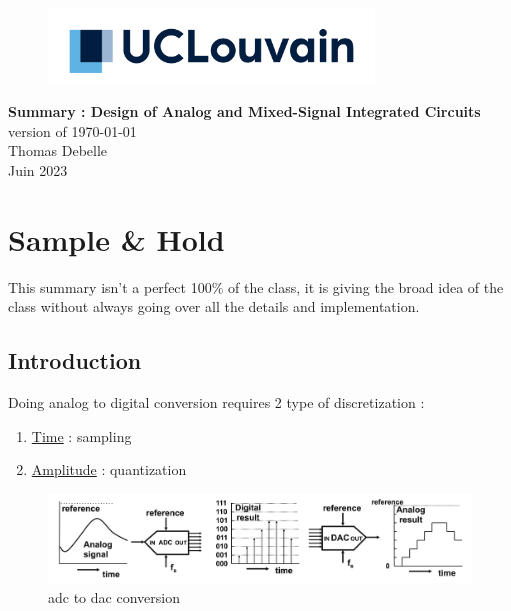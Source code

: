 \documentclass{report}
\begin{document}



\begin{titlepage}
    \begin{figure}
        \includegraphics[height = 2cm]{img/UCL_Logo.png}
        \label{fig:my_label}
    \end{figure}

    \hspace*{100cm}
    \centering
    \vspace*{7cm}

    {\Huge \textbf{Summary : Design of Analog and Mixed-Signal Integrated Circuits}}\\
    \vspace*{0.25cm}
    version of \today\\
    \vspace*{0.25cm}
    \Large{Thomas Debelle}\\

    \vspace*{9cm} %
    {\Large Juin 2023}
\end{titlepage}

\tableofcontents
\newpage

\chapter{Sample \& Hold}
This summary isn't a perfect 100$\%$ of the class, it is giving the broad idea of the class without always going over all the details and implementation.
\section{Introduction}

Doing analog to digital conversion requires 2 type of discretization :
\begin{enumerate}
    \item \underline{Time} : sampling
    \item \underline{Amplitude} : quantization
\end{enumerate}


\begin{figure}[H]
  \begin{center}
    \includegraphics[width=0.7\linewidth]{img/ADC-DAC.png}
    \caption{\gls{adc} to \gls{dac} conversion}
  \end{center}
\end{figure}
\end{document}
